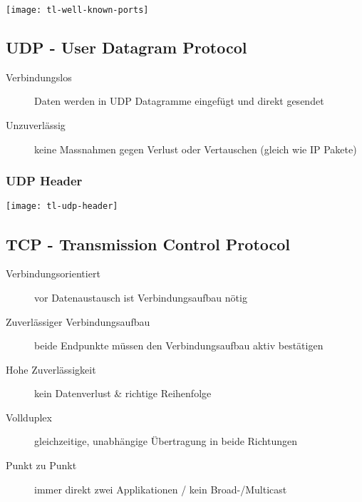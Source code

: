 \begin{center}
    \texttt{[image: tl-well-known-ports]}
\end{center}



\subsection{UDP - User Datagram Protocol}

\begin{description}
    \item[Verbindungslos] Daten werden in UDP Datagramme eingefügt und direkt gesendet
    \item[Unzuverlässig] keine Massnahmen gegen Verlust oder Vertauschen
        (gleich wie IP Pakete)
\end{description}

\subsubsection{UDP Header}
\begin{center}
    \texttt{[image: tl-udp-header]}
\end{center}



\subsection{TCP - Transmission Control Protocol}

\begin{description}
    \item[Verbindungsorientiert] vor Datenaustausch ist Verbindungsaufbau nötig
    \item[Zuverlässiger Verbindungsaufbau] beide Endpunkte müssen den Verbindungsaufbau
        aktiv bestätigen
    \item[Hohe Zuverlässigkeit] kein Datenverlust \& richtige Reihenfolge
    \item[Vollduplex] gleichzeitige, unabhängige Übertragung in beide Richtungen
    \item[Punkt zu Punkt] immer direkt zwei Applikationen / kein Broad-/Multicast
\end{description}

